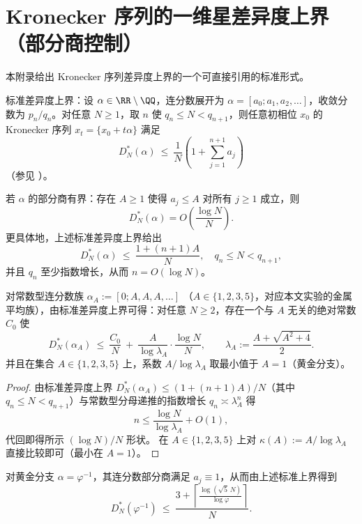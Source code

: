 \section{Kronecker 序列的一维星差异度上界（部分商控制）}\label{app:kronecker-discrepancy}

本附录给出 Kronecker 序列差异度上界的一个可直接引用的标准形式。

标准差异度上界：设 $\alpha\in\RR\setminus\QQ$，连分数展开为 $\alpha=[a_0;a_1,a_2,\dots]$，收敛分数为 $p_n/q_n$。对任意 $N\ge 1$，取 $n$ 使 $q_n\le N<q_{n+1}$，则任意初相位 $x_0$ 的 Kronecker 序列 $x_t=\{x_0+t\alpha\}$ 满足
\[
D_N^*(\alpha)\ \le\ \frac{1}{N}\left(1+\sum_{j=1}^{n+1}a_j\right)
\]
（参见 \cite{KuipersNiederreiter1974,Goda2024QuasiUniformKronecker}）。

\begin{corollary}\label{cor:kronecker-discrepancy-const-type}
若 $\alpha$ 的部分商有界：存在 $A\ge 1$ 使得 $a_j\le A$ 对所有 $j\ge 1$ 成立，则
\[
D_N^*(\alpha)=O\!\left(\frac{\log N}{N}\right).
\]
更具体地，上述标准差异度上界给出
\[
D_N^*(\alpha)\ \le\ \frac{1+(n+1)A}{N},
\quad
q_n\le N<q_{n+1},
\]
并且 $q_n$ 至少指数增长，从而 $n=O(\log N)$。
\end{corollary}

\begin{corollary}\label{cor:kronecker-discrepancy-metallic-minimax}
对常数型连分数族
\(
\alpha_A:=[0;A,A,A,\dots]
\)
（$A\in\{1,2,3,5\}$，对应本文实验的金属平均族），由标准差异度上界可得：对任意 $N\ge 2$，存在一个与 $A$ 无关的绝对常数 $C_0$ 使
\[
D_N^*(\alpha_A)\ \le\ \frac{C_0}{N}\ +\ \frac{A}{\log \lambda_A}\cdot \frac{\log N}{N},
\qquad
\lambda_A:=\frac{A+\sqrt{A^2+4}}{2}.
\]
并且在集合 $A\in\{1,2,3,5\}$ 上，系数 \(A/\log\lambda_A\) 取最小值于 \(A=1\)（黄金分支）。
\end{corollary}

\begin{proof}
由标准差异度上界 \(D_N^*(\alpha_A)\le (1+(n+1)A)/N\)（其中 \(q_n\le N<q_{n+1}\)）与常数型分母递推的指数增长 \(q_n\asymp\lambda_A^n\) 得
\[
n\le \frac{\log N}{\log\lambda_A}+O(1),
\]
代回即得所示 \((\log N)/N\) 形状。
在 \(A\in\{1,2,3,5\}\) 上对 \(\kappa(A):=A/\log\lambda_A\) 直接比较即可（最小在 \(A=1\)）。
\end{proof}

对黄金分支 $\alpha=\varphi^{-1}$，其连分数部分商满足 $a_j\equiv 1$，从而由上述标准上界得到
\[
D_N^*(\varphi^{-1})\ \le\ \frac{3+\left\lceil \frac{\log(\sqrt5\,N)}{\log \varphi}\right\rceil}{N}.
\]

